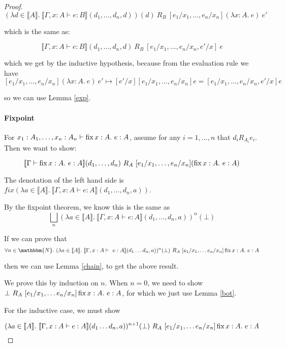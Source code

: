 \begin{proof}
\[ (\lambda d \in \llbracket A \rrbracket. \ \llbracket \Gamma, x :A \vdash e : B \rrbracket (d_1, \dots, d_n,d))(d) \ R_B \ [e_1/x_1, \dots, e_n/x_n] (\lambda x:A. \ e) \ e'\]

which is the same as:

\[ \llbracket \Gamma, x :A \vdash e : B \rrbracket (d_1, \dots, d_n, d) \ R_B \ [e_1/x_1, \dots, e_n/x_n, e'/x] \ e \]

which we get by the inductive hypothesis, because from the evaluation rule we have \[[e_1/x_1, \dots, e_n/x_n] (\lambda x:A. \ e) \ e'  \mapsto [e'/x][e_1/x_1, \dots, e_n/x_n]e = [e_1/x_1, \dots, e_n/x_n, e'/x]e\]

 so we can use Lemma \ref{exp}. 

\paragraph{Fixpoint}
For $x_1 : A_1, \dots, x_n : A_n \vdash \operatorname{fix} x:A. \ e : A$, assume for any $i = 1, \dots, n$ that $d_i R_{A_i} e_i$. Then we want to show:

\[ \llbracket \Gamma \vdash \operatorname{fix} x:A. \ e : A \rrbracket (d_1, \dots, d_n) \ R_A \ [e_1/x_1, \dots, e_n/x_n] (\operatorname{fix} x:A. \ e : A) \]

The denotation of the left hand side is $fix( \lambda a \in \llbracket A \rrbracket. \  \llbracket \Gamma, x :A \vdash e : A \rrbracket(d_1, \dots, d_n, a))$.

By the fixpoint theorem, we know this is the same as 
\[\bigsqcup_n (\lambda a \in \llbracket A \rrbracket. \  \llbracket \Gamma, x :A \vdash e : A \rrbracket(d_1, \dots, d_n, a))^n(\bot)\]


If we can prove that \[\forall n \in \mathbbm{N}. \ (\lambda a \in \llbracket A \rrbracket. \ \llbracket \Gamma, x : A \vdash \ e : A \rrbracket(d_1 \dots d_n, a))^n(\bot) \ R_A \ [e_1/x_1, \dots e_n/x_n]\fix x : A. \ e : A\]

then we can use Lemma \ref{chain}, to get the above result.

We prove this by induction on $n$. When $n = 0$, we need to show $\bot \ R_A \ [e_1/x_1, \dots e_n/x_n]\operatorname{fix} x : A. \ e : A$, for which we just use Lemma \ref{bot}.

For the inductive case, we must show 

\[(\lambda a \in \llbracket A \rrbracket. \ \llbracket \Gamma, x : A \vdash e : A \rrbracket(d_1 \dots d_n,a))^{n+1}(\bot) \ R_A \ [e_1/x_1, \dots e_n/x_n]\operatorname{fix} x : A. \ e : A\]


\end{proof}
